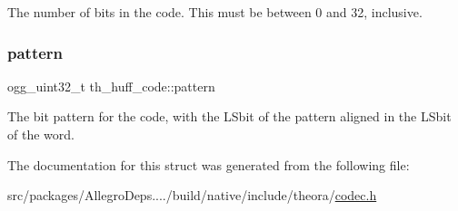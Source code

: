 The number of bits in the code. This must be between 0 and 32, inclusive. \mbox{\label{structth__huff__code_a6dd29e3aa5a0c5a2dd5ce1f45b1162b4}} 
\subsubsection{\texorpdfstring{pattern}{pattern}}
{\footnotesize\ttfamily ogg\+\_\+uint32\+\_\+t th\+\_\+huff\+\_\+code\+::pattern}

The bit pattern for the code, with the L\+Sbit of the pattern aligned in the L\+Sbit of the word. 

The documentation for this struct was generated from the following file\+:\begin{DoxyCompactItemize}
\item 
src/packages/\+Allegro\+Deps..../build/native/include/theora/\hyperlink{theora_2codec_8h}{codec.\+h}\end{DoxyCompactItemize}
